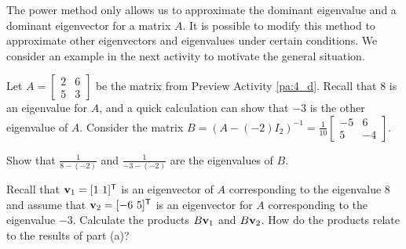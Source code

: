 
The power method only allows us to approximate the dominant eigenvalue and a dominant eigenvector for a matrix $A$. It is possible to modify this method to approximate other eigenvectors and eigenvalues under certain conditions. We consider an example in the next activity to motivate the general situation.



\begin{activity} \label{act:4_e_2} Let $A = \left[ \begin{array}{cc} 2&6 \\ 5&3 \end{array} \right]$ be the matrix from Preview Activity \ref{pa:4_d}. Recall that $8$ is an eigenvalue for $A$, and a quick calculation can show that $-3$ is the other eigenvalue of $A$. Consider the matrix $B = (A - (-2)I_2)^{-1} = \frac{1}{10}\left[ \begin{array}{rr} -5&6 \\ 5&-4 \end{array} \right]$. 
	\ba
	\item Show that $\frac{1}{8-(-2)}$ and $\frac{1}{-3-(-2)}$ are the eigenvalues of $B$. 



	\item Recall that $\mathbf{v}_1 = [1 \ 1]^{\mathsf{T}}$ is an eigenvector of $A$ corresponding to the eigenvalue $8$ and assume that $\vv_2 = [-6 \ 5]^{\tr}$ is an eigenvector for $A$ corresponding to the eigenvalue $-3$. Calculate the products $B \mathbf{v}_1$ and $B \mathbf{v}_2$. How do the products relate to the results of part (a)? 



	\ea
	
\end{activity}



